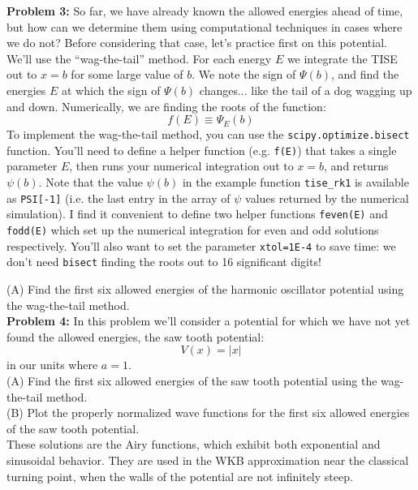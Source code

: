 \documentclass[12pt]{article}
\begin{document}
\noindent
{\bf Problem 3:}
So far, we have already known the allowed energies ahead of time, but how can we determine them using computational techniques in cases where we do not?  Before considering that case, let's practice first on this potential.  We'll use the ``wag-the-tail'' method.  For each energy $E$ we integrate the TISE out to $x=b$ for some large value of $b$.  We note the sign of $\Psi(b)$, and find the energies $E$ at which the sign of $\Psi(b)$ changes... like the tail of a dog wagging up and down.  Numerically, we are finding the roots of the function:
$$f(E) \equiv \Psi_E(b)$$
To implement the wag-the-tail method, you can use the {\tt scipy.optimize.bisect} function.  You'll need to define a helper function (e.g. {\tt f(E)}) that takes a single parameter $E$, then runs your numerical integration out to $x=b$, and returns $\psi(b)$.  Note that the value $\psi(b)$ in the example function {\tt tise\_rk1} is available as {\tt PSI[-1]} (i.e. the last entry in the array of $\psi$ values returned by the numerical simulation).
I find it convenient to define two helper functions {\tt feven(E)} and {\tt fodd(E)} which set up the numerical integration for even and odd solutions respectively.  You'll also want to set the parameter {\tt xtol=1E-4} to save time: we don't need {\tt bisect} finding 
the roots out to 16 significant digits!

\noindent
(A) Find the first six allowed energies of the harmonic oscillator potential using the wag-the-tail method.\\[5pt]

\noindent
{\bf Problem 4:}  In this problem we'll consider a potential for which we have not yet found the allowed energies, the saw tooth potential:
$$V(x) = |x|$$
in our units where $a=1$.\\[5pt]

\noindent
(A) Find the first six allowed energies of the saw tooth potential using the wag-the-tail method.\\[5pt]

\noindent
(B) Plot the properly normalized wave functions for the first six allowed energies of the saw tooth potential.\\[5pt]

\noindent
These solutions are the Airy functions, which exhibit both exponential and sinusoidal behavior.  They are used in the WKB approximation near the classical turning point, when the walls of the potential are not infinitely steep.
\end{document}
